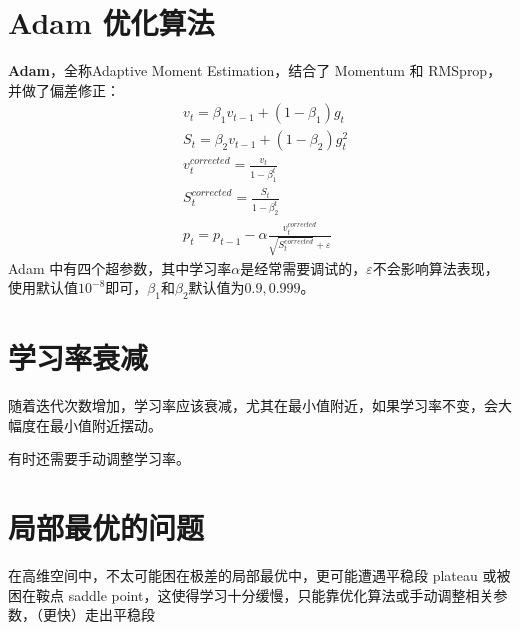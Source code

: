 \documentclass[../../main.tex]{subfiles}
\begin{document}
\section{Adam 优化算法}
\textbf{Adam}，全称Adaptive Moment Estimation，结合了 Momentum 和 RMSprop，并做了偏差修正：
\begin{align*}
     & v_t = β_1v_{t-1} + (1-β_1)g_{t}                                     \\
     & S_t = β_2v_{t-1} + (1-β_2)g_{t}^2                                   \\
     & v_t^{corrected} = \frac{v_t}{1-β_1^t}                               \\
     & S_t^{corrected} = \frac{S_t}{1-β_2^t}                               \\
     & p_t = p_{t-1} - α\frac{v_t^{corrected}}{\sqrt{S_t^{corrected}} + ε}
\end{align*}
Adam 中有四个超参数，其中学习率\(α\)是经常需要调试的，\(ε\)不会影响算法表现，使用默认值\(10^{-8}\)即可，\(β_1\)和\(β_2\)默认值为\(0.9, 0.999\)。

\section{学习率衰减}
随着迭代次数增加，学习率应该衰减，尤其在最小值附近，如果学习率不变，会大幅度在最小值附近摆动。

有时还需要手动调整学习率。

\section{局部最优的问题}
在高维空间中，不太可能困在极差的局部最优中，更可能遭遇平稳段 plateau 或被困在鞍点 saddle point，这使得学习十分缓慢，只能靠优化算法或手动调整相关参数，（更快）走出平稳段
\end{document}

